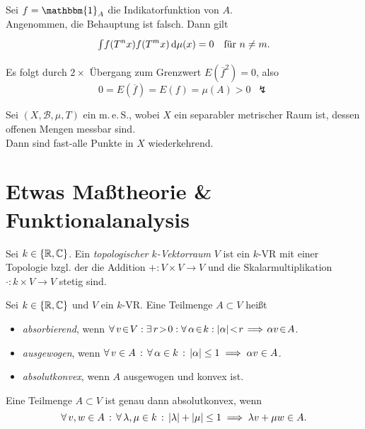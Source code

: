 \documentclass{cheat-sheet}
\newcommand{\Bor}{\mathcal{B}} %
\newcommand{\meS}{m.\,e.\,S.} %
\newcommand{\meST}{$(X, \Bor, \mu, T)$} %
\newcommand{\ind}{\mathbbm{1}} %
\begin{document}
\begin{beweis}
  Sei $f = \ind_A$ die Indikatorfunktion von $A$. \\
  Angenommen, die Behauptung ist falsch. Dann gilt
  \[
    {\textstyle \int\limits_{}^{}} f(T^n x)f(T^m x) \,\mathrm{d} \mu(x) = 0 \quad
    \text{für $n \not= m$.}
  \]
  Es folgt durch $2 \times$ Übergang zum Grenzwert $E(\overline{f}^2) = 0$, also
  \[ 0 = E(\overline{f}) = E(f) = \mu(A) > 0 \enspace \lightning \]
\end{beweis}

\begin{thm}
  Sei \meST{} ein \meS{}, wobei $X$ ein separabler metrischer Raum ist, dessen offenen Mengen messbar sind. \\
  Dann sind fast-alle Punkte in $X$ wiederkehrend.
\end{thm}

\section{Etwas Maßtheorie \& Funktionalanalysis}

\begin{defn}
  Sei $k \in \{ \mathbb{R}, \mathbb{C} \}$.
  Ein \emph{topologischer $k$-Vektorraum} $V$ ist ein $k$-VR mit einer Topologie bzgl. der die Addition $+ : V \times V \to V$ und die Skalarmultiplikation $\cdot : k \times V \to V$ stetig sind.
\end{defn}

\begin{defn}
  Sei $k \in \{ \mathbb{R}, \mathbb{C} \}$ und $V$ ein $k$-VR.
  Eine Teilmenge $A \subset V$ heißt
  \begin{itemize}
    \item \emph{absorbierend}, wenn
    $\fa{v \!\in\! V\!}\! \ex{r \!>\! 0\!}\! \fa{\alpha \!\in\! k\!}\! \abs{\alpha} \!<\! r \!\implies\! \alpha v \!\in\! A$.
    \item \emph{ausgewogen}, wenn $\forall \, {v \in A} \,:\, \forall \, {\alpha \in k} \,:\, \lvert\alpha\rvert \leq 1 \implies \alpha v \in A$.
    \item \emph{absolutkonvex}, wenn $A$ ausgewogen und konvex ist.
  \end{itemize}
\end{defn}

\begin{lem}
  Eine Teilmenge $A \!\subset\! V$ ist genau dann absolutkonvex, wenn
  \[ \forall \, {v, w \in A} \,:\, \forall \, {\lambda, \mu \in k} \,:\, \lvert\lambda\rvert + \lvert\mu\rvert \leq 1 \implies \lambda v + \mu w \in A. \]
\end{lem}
\end{document}
